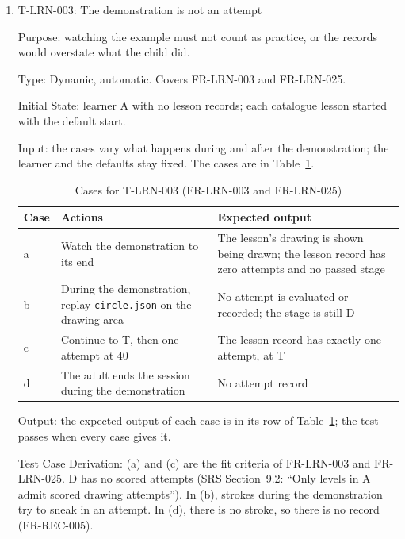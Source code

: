 \documentclass[12pt, titlepage]{article}
\newcommand{\testitem}[1]{\item #1\par\nopagebreak}
\begin{document}
\begin{enumerate}
How test will be performed: Playwright reads the visible stage and the
lesson record. A tester repeats (a) to (c) with the stylus on the test iPad
at each milestone.

\testitem{T-LRN-003: The demonstration is not an attempt}

Purpose: watching the example must not count as practice, or the records
would overstate what the child did.

Type: Dynamic, automatic. Covers FR-LRN-003 and FR-LRN-025.

Initial State: learner A with no lesson records; each catalogue lesson
started with the default start.

Input: the cases vary what happens during and after the demonstration; the
learner and the defaults stay fixed. The cases are in
Table~\ref{tab:t-lrn-003}.

\begin{table}[htbp]
\centering\small
\caption{Cases for T-LRN-003 (FR-LRN-003 and FR-LRN-025)}
\label{tab:t-lrn-003}
\begin{tabularx}{\textwidth}{@{}l >{\raggedright\arraybackslash}X
  >{\raggedright\arraybackslash}X@{}}
\toprule
\textbf{Case} & \textbf{Actions} & \textbf{Expected output}\\
\midrule
a & Watch the demonstration to its end & The lesson's drawing is shown being
drawn; the lesson record has zero attempts and no passed stage\\
b & During the demonstration, replay \texttt{circle.json} on the drawing
area & No attempt is evaluated or recorded; the stage is still D\\
c & Continue to T, then one attempt at 40 & The lesson record has exactly
one attempt, at T\\
d & The adult ends the session during the demonstration & No attempt
record\\
\bottomrule
\end{tabularx}
\end{table}

Output: the expected output of each case is in its row of
Table~\ref{tab:t-lrn-003}; the test passes when every case gives it.

Test Case Derivation: (a) and (c) are the fit criteria of FR-LRN-003 and
FR-LRN-025. D has no scored
attempts (SRS Section~9.2: ``Only levels in A admit scored drawing
attempts''). In (b), strokes during the demonstration try to sneak in an
attempt. In (d), there is no stroke, so there is no record (FR-REC-005).


\end{enumerate}
\end{document}
